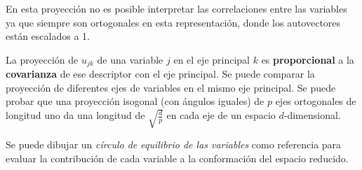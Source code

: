 \documentclass[]{book}
\theoremstyle{definition}
\theoremstyle{definition}
\theoremstyle{definition}
\theoremstyle{remark}
\begin{document}
En esta proyección no es posible interpretar las correlaciones entre las
variables ya que siempre son ortogonales en esta representación, donde
los autovectores están escalados a 1.

La proyección de \(u_{jk}\) de una variable \(j\) en el eje principal
\(k\) es \textbf{proporcional} a la \textbf{covarianza} de ese
descriptor con el eje principal. Se puede comparar la proyección de
diferentes ejes de variables en el mismo eje principal. Se puede probar
que una proyección isogonal (con ángulos iguales) de \(p\) ejes
ortogonales de longitud uno da una longitud de \(\sqrt{\frac{d}{p}}\) en
cada eje de un espacio \(d\)-dimensional.

Se puede dibujar un \emph{círculo de equilibrio de las variables} como
referencia para evaluar la contribución de cada variable a la
conformación del espacio reducido.
\end{document}
